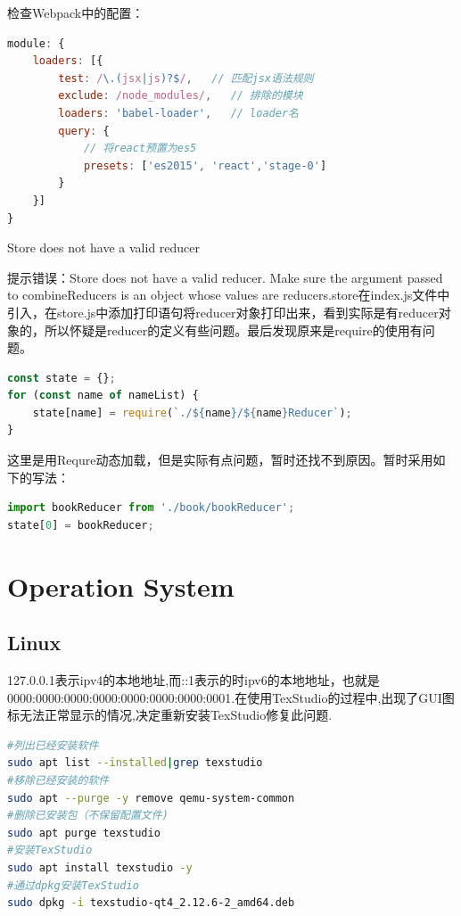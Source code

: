 \documentclass[12pt]{book}
\makeatletter
\numberwithin{dummy}{section}
\theoremstyle{ocrenumbox}
\theoremstyle{blacknumex}
\theoremstyle{blacknumbox}
\theoremstyle{ocrenum}
\renewcommand\paragraph{\@startsection{paragraph}{4}{\z@}
	{-2ex \@plus-.2ex \@minus .2ex}
	{.1ex}
	{\normalfont\small\sffamily\bfseries}}
\makeatother
\begin{document}
检查Webpack中的配置：

\begin{lstlisting}[language=Javascript]
module: {
	loaders: [{
		test: /\.(jsx|js)?$/,   // 匹配jsx语法规则
		exclude: /node_modules/,   // 排除的模块
		loaders: 'babel-loader',   // loader名
		query: {
			// 将react预置为es5
			presets: ['es2015', 'react','stage-0']
		}
	}]
}
\end{lstlisting}

\paragraph{Store does not have a valid reducer}

提示错误：Store does not have a valid reducer. Make sure the argument passed to combineReducers is an object whose values are reducers.store在index.js文件中引入，在store.js中添加打印语句将reducer对象打印出来，看到实际是有reducer对象的，所以怀疑是reducer的定义有些问题。最后发现原来是require的使用有问题。

\begin{lstlisting}[language=Javascript]
const state = {};
for (const name of nameList) {
	state[name] = require(`./${name}/${name}Reducer`);
}
\end{lstlisting}

这里是用Requre动态加载，但是实际有点问题，暂时还找不到原因。暂时采用如下的写法：


\begin{lstlisting}[language=Javascript]
import bookReducer from './book/bookReducer';
state[0] = bookReducer;
\end{lstlisting}

\clearpage

\part{Operation System}

\chapter{Linux}

127.0.0.1表示ipv4的本地地址,而::1表示的时ipv6的本地地址，也就是0000:0000:0000:0000:0000:0000:0000:0001.在使用TexStudio的过程中,出现了GUI图标无法正常显示的情况,决定重新安装TexStudio修复此问题.

\begin{lstlisting}[language=Bash]
#列出已经安装软件
sudo apt list --installed|grep texstudio
#移除已经安装的软件
sudo apt --purge -y remove qemu-system-common 
#删除已安装包（不保留配置文件)
sudo apt purge texstudio
#安装TexStudio
sudo apt install texstudio -y
#通过dpkg安装TexStudio
sudo dpkg -i texstudio-qt4_2.12.6-2_amd64.deb 
\end{lstlisting}
\end{document}
